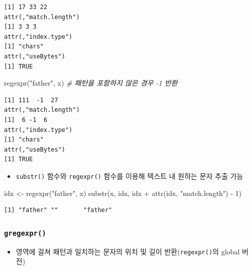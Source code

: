 \documentclass[
  11pt,
]{krantz}
\newenvironment{Shaded}{\begin{snugshade}}{\end{snugshade}}
\newcommand{\CommentTok}[1]{\textcolor[rgb]{0.37,0.37,0.37}{\textit{#1}}}
\newcommand{\DecValTok}[1]{\textcolor[rgb]{0.06,0.06,0.06}{#1}}
\newcommand{\FunctionTok}[1]{\textcolor[rgb]{0,0,0}{#1}}
\newcommand{\NormalTok}[1]{#1}
\newcommand{\OtherTok}[1]{\textcolor[rgb]{0.37,0.37,0.37}{#1}}
\newcommand{\SpecialCharTok}[1]{\textcolor[rgb]{0,0,0}{#1}}
\newcommand{\StringTok}[1]{\textcolor[rgb]{0.5,0.5,0.5}{#1}}
\providecommand{\tightlist}{%
  \setlength{\itemsep}{0pt}\setlength{\parskip}{0pt}}
\begin{document}
\begin{verbatim}
[1] 17 33 22
attr(,"match.length")
[1] 3 3 3
attr(,"index.type")
[1] "chars"
attr(,"useBytes")
[1] TRUE
\end{verbatim}

\begin{Shaded}
\begin{Highlighting}[]
\FunctionTok{regexpr}\NormalTok{(}\StringTok{"father"}\NormalTok{, x) }\CommentTok{\# 패턴을 포함하지 않은 경우 {-}1 반환}
\end{Highlighting}
\end{Shaded}

\begin{verbatim}
[1] 111  -1  27
attr(,"match.length")
[1]  6 -1  6
attr(,"index.type")
[1] "chars"
attr(,"useBytes")
[1] TRUE
\end{verbatim}

\normalsize

\begin{itemize}
\tightlist
\item
  \texttt{substr()} 함수와 \texttt{regexpr()} 함수를 이용해 텍스트 내 원하는 문자 추출 가능
\end{itemize}

\footnotesize

\begin{Shaded}
\begin{Highlighting}[]
\NormalTok{idx }\OtherTok{\textless{}{-}} \FunctionTok{regexpr}\NormalTok{(}\StringTok{"father"}\NormalTok{, x)}
\FunctionTok{substr}\NormalTok{(x, idx, idx }\SpecialCharTok{+} \FunctionTok{attr}\NormalTok{(idx, }\StringTok{"match.length"}\NormalTok{) }\SpecialCharTok{{-}} \DecValTok{1}\NormalTok{)}
\end{Highlighting}
\end{Shaded}

\begin{verbatim}
[1] "father" ""       "father"
\end{verbatim}

\normalsize

\hypertarget{gregexpr}{%
\subsubsection*{\texorpdfstring{\textbf{\texttt{gregexpr()}}}{gregexpr()}}\label{gregexpr}}


\begin{itemize}
\tightlist
\item
  영역에 걸쳐 패턴과 일치하는 문자의 위치 및 길이 반환(\texttt{regexpr()}의 global 버전)
\end{itemize}
\end{document}

